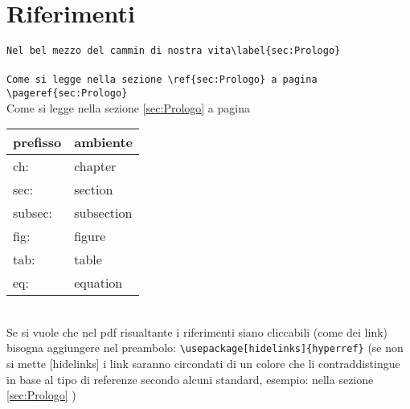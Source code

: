 \section{Riferimenti}
  \texttt{Nel bel mezzo del cammin di nostra vita\textbackslash label\{sec:Prologo\}}\label{sec:Prologo}\\~\\
  \texttt{Come si legge nella sezione \textbackslash ref\{sec:Prologo\} a pagina \textbackslash pageref\{sec:Prologo\}}\\
 Come si legge nella sezione \ref{sec:Prologo} a pagina \pageref{sec:Prologo}
 \begin{table}[!ht]\centering
 \begin{tabular}{l|l}
  prefisso & ambiente\\\hline
  ch: 	&chapter\\
  sec: 	&section\\
  subsec: 	&subsection\\
  fig: 	&figure\\
  tab: 	&table\\
  eq: 	&equation\\
\end{tabular}\end{table}
\\Se si vuole che nel pdf risualtante i riferimenti siano cliccabili (come dei link) bisogna aggiungere nel preambolo: \verb!\usepackage[hidelinks]{hyperref}! (se non si mette [hidelinks] i link saranno circondati di un colore che li contraddistingue in base al tipo di referenze secondo alcuni standard,
 esempio: nella sezione \ref{sec:Prologo}
\hypersetup{hidelinks})

